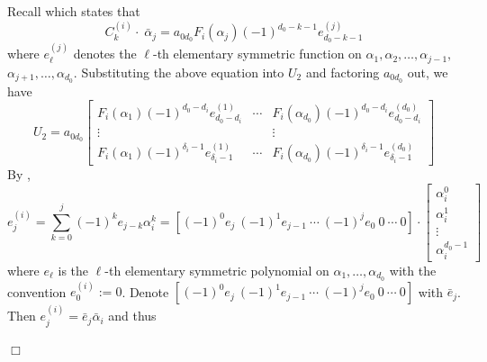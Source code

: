 \documentclass{article}
\newenvironment{proof}{\noindent{\em Proof:}}{$\Box$~\\}
\begin{document}
\begin{proof}
Recall \cite[Lemma 35]{hong2021subresultant} which states that
$$C_k^{(i)} \cdot \;{\bar \alpha _j} = {a_{{0d_0}}}{F_i}({\alpha _j}){( - 1)^{{d_0} - k-1}}e_{{d_0} - k-1}^{(j)}$$
where
$e_{\ell}^{(j)}$ denotes the $\ell$-th elementary symmetric function on  ${\alpha _1},{\alpha _2}, \ldots ,{\alpha _{j - 1}},$ ${\alpha _{j + 1}}, \ldots ,{\alpha _{{d_0}}}$.
Substituting the above equation into  $U_{2}$ and factoring $a_{0d_0}$ out, we have
$$U_{2}= a_{0d_0}\left[
\begin{array}{*{20}{c}}
F_i(\alpha _1)( - 1)^{d_0 - d_i}e_{d_0 - d_i}^{(1)}& \cdots &F_i(\alpha_{d_0})( - 1)^{d_0 - d_i}e_{d_0 - d_i}^{(d_0)}\\
 \vdots &{}& \vdots \\
{F_i}({\alpha _1})( - 1)^{\delta _i - 1}e_{\delta _i - 1}^{(1)}& \cdots &F_i(\alpha _{d_0})( - 1)^{\delta _i - 1}e_{\delta _i - 1}^{(d_0)}
\end{array} \right]
$$
By \cite[Lemma 36]{hong2021subresultant},
$$e_j^{(i)} = \sum\limits_{k = 0}^j {{{( - 1)}^k}} {e_{j - k}}\alpha _i^k=
[(-1)^0e_j~(-1)^1e_{j-1}~\cdots~(-1)^je_0~0~\cdots~0]\cdot \begin{bmatrix}
{\alpha _i^0}\\{\alpha _i^1}\\ \vdots \\{\alpha _i^{{d_0} - 1}}
\end{bmatrix} $$
where $e_\ell$ is the $\ell$-th elementary symmetric polynomial on $\alpha_1,\ldots,\alpha_{d_0}$
with the convention $e_0^{(i)}:=0$.
Denote $[(-1)^0e_j~(-1)^1e_{j-1}~\cdots~(-1)^je_0~0~\cdots~0]$ with $\bar{e}_j$. Then $e_j^{(i)}=\bar{e}_j\bar{\alpha}_i$ and thus

\end{proof}
\end{document}
